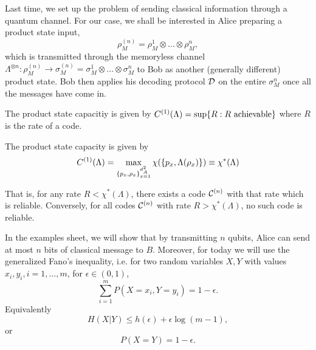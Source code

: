 Last time, we set up the problem of sending classical information through a quantum channel. For our case, we shall be interested in Alice preparing a product state input,
\begin{equation}
    \rho_M^{(n)}= \rho_M^1 \otimes \ldots \otimes \rho_M^n,
\end{equation}
which is transmitted through the memoryless channel $\Lambda^{\otimes n}: \rho^{(n)}_M \to \sigma_M^{(n)} = \sigma_M^1 \otimes \ldots \otimes \sigma_M^n$ to Bob as another (generally different) product state. Bob then applies his decoding protocol $\mathcal{D}$ on the entire $\sigma_M^n$ once all the messages have come in.

The product state capacitiy is given by $C^{(1)}(\Lambda)= \sup\{R: R\text{ achievable}\}$ where $R$ is the rate of a code.
\begin{thm}
    The product state capacity is given by
    \begin{equation}
        C^{(1)}(\Lambda)=\max_{\{p_x,\rho_x\}_{x=1}^{d_A^2}} \chi(\{p_x,\Lambda(\rho_x)\}) \equiv \chi^*(\Lambda)
    \end{equation}
\end{thm}
That is, for any rate $R< \chi^*(\Lambda)$, there exists a code $\mathcal{C}^{(n)}$ with that rate which is reliable. Conversely, for all codes $\mathcal{C}^{(n)}$ with rate $R >\chi^*(\Lambda)$, no such code is reliable.

In the examples sheet, we will show that by transmitting $n$ qubits, Alice can send at most $n$ bits of classical message to $B$. Moreover, for today we will use the generalized Fano's inequality, i.e. for two random variables $X,Y$ with values $x_i,y_i,i=1,\ldots,m$, for $\epsilon\in (0,1)$,
\begin{equation}
    \sum_{i=1}^m P(X=x_i,Y=y_i)=1-\epsilon.
\end{equation}
Equivalently
\begin{equation}
    H(X|Y)\leq h(\epsilon) + \epsilon \log(m-1),
\end{equation}
or
\begin{equation}
    P(X=Y)=1-\epsilon.
\end{equation}

